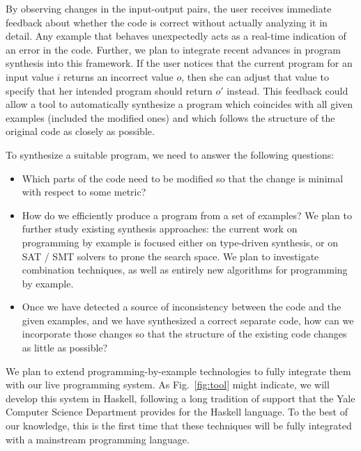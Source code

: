 By observing changes in the input-output pairs, the user receives immediate feedback about whether the code is correct without actually analyzing it in detail. Any example that behaves unexpectedly acts as a real-time indication of an error in the code. Further, we plan to integrate recent advances in program synthesis into this framework.
If the user notices that the current program for an input value $i$ returns an incorrect value $o$, then she can adjust that value to specify that her intended program should return $o'$ instead. This feedback could allow a tool to automatically synthesize a program which coincides with all given examples (included the modified ones) and which follows the structure of the original code as closely as possible.

To synthesize a suitable program, we need to answer the following questions:
\begin{itemize}
\item Which parts of the code need to be modified so that the change is minimal with respect to some metric?%
\item How do we efficiently produce a program from a set of examples?
We plan to further study existing synthesis approaches: the current work on programming by example is focused either on type-driven synthesis, or on SAT / SMT solvers to prone the search space. We plan to investigate combination techniques, as well as entirely new algorithms for programming by example.
\item Once we have detected a source of inconsistency between the code and the given examples, and we have synthesized a correct separate code, how can we incorporate those changes so that the structure of the existing code changes as little as possible?
\end{itemize}

We plan to extend programming-by-example technologies to fully integrate them with our live programming system. As Fig.~\ref{fig:tool} might indicate, we will develop this system in Haskell, following a long tradition of support that the Yale Computer Science Department provides for the Haskell language. To the best of our knowledge, this is the first time that these techniques will be fully integrated with a mainstream programming language.

